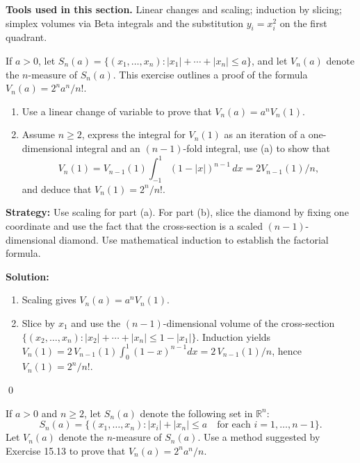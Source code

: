 \noindent\textbf{Tools used in this section.} Linear changes and scaling; induction by slicing; simplex volumes via Beta integrals and the substitution \(y_i=x_i^2\) on the first quadrant.



\begin{problembox}
If \( a > 0 \), let \( S_n(a) = \{(x_1, \ldots, x_n): |x_1| + \cdots + |x_n| \leq a\} \), and let \( V_n(a) \) denote the \( n \)-measure of \( S_n(a) \). This exercise outlines a proof of the formula \( V_n(a) = 2^n a^n / n! \).
\begin{enumerate}[label=(\alph*)]
\item Use a linear change of variable to prove that \( V_n(a) = a^n V_n(1) \).
\item Assume \( n \geq 2 \), express the integral for \( V_n(1) \) as an iteration of a one-dimensional integral and an \( (n - 1) \)-fold integral, use (a) to show that
\[
V_n(1) = V_{n-1}(1) \int_{-1}^1 (1 - |x|)^{n-1} \, dx = 2V_{n-1}(1)/n,
\]
and deduce that \( V_n(1) = 2^n / n! \).
\end{enumerate}
\end{problembox}

\noindent\textbf{Strategy:} Use scaling for part (a). For part (b), slice the diamond by fixing one coordinate and use the fact that the cross-section is a scaled \((n-1)\)-dimensional diamond. Use mathematical induction to establish the factorial formula.

\bigskip\noindent\textbf{Solution:}
\begin{enumerate}[label=(\alph*)]
\item Scaling gives \(V_n(a)=a^n V_n(1)\).
\item Slice by \(x_1\) and use the \((n-1)\)-dimensional volume of the cross-section \(\{(x_2,\ldots,x_n): |x_2|+\cdots+|x_n|\le 1-|x_1|\}\). Induction yields
\(V_n(1)=2\,V_{n-1}(1)\int_0^1 (1-x)^{n-1}dx=2\,V_{n-1}(1)/n\), hence \(V_n(1)=2^n/n!\).
\end{enumerate}\qed


\begin{problembox}
If \( a > 0 \) and \( n \geq 2 \), let \( S_n(a) \) denote the following set in \( \mathbb{R}^n \):
\[
S_n(a) = \{(x_1, \ldots, x_n): |x_i| + |x_n| \leq a \quad \text{for each } i = 1, \ldots, n - 1\}.
\]
Let \( V_n(a) \) denote the \( n \)-measure of \( S_n(a) \). Use a method suggested by Exercise 15.13 to prove that \( V_n(a) = 2^n a^n / n \).
\end{problembox}

